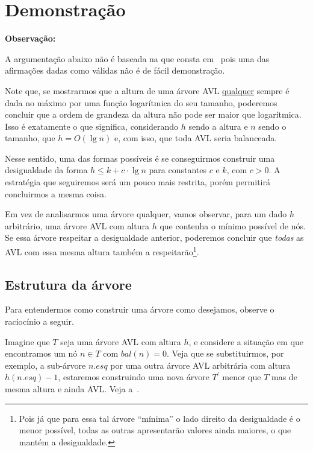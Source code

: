 \documentclass[11pt,twoside]{article}
\theoremstyle{definition}
\begin{document}
\section{Demonstração}

\begin{framed}
	{\bfseries Observação:}

	A argumentação abaixo não é baseada na que consta em~\textcite{Szwarcfiter2010} pois uma das afirmações dadas como válidas não é de fácil demonstração.
\end{framed}

Note que, se mostrarmos que a altura de uma árvore AVL \ul{qualquer} sempre é dada no máximo por uma função logarítmica do seu tamanho, poderemos concluir que a ordem de grandeza da altura não pode ser maior que logarítmica. Isso é exatamente o que significa, considerando \( h \) sendo a altura e \( n \) sendo o tamanho, que \( h = O(\lg n) \) e, com isso, que toda AVL seria balanceada.

Nesse sentido, uma das formas possíveis é se conseguirmos construir uma desigualdade da forma \( h \leq k + c \cdot \lg n \) para constantes \( c \) e \( k \), com \( c > 0 \). A estratégia que seguiremos será um pouco mais restrita, porém permitirá concluirmos a mesma coisa.

Em vez de analisarmos uma árvore qualquer, vamos observar, para um dado \( h \) arbitrário, uma árvore AVL com altura \( h \) que contenha o mínimo possível de nós. Se essa árvore respeitar a desigualdade anterior, poderemos concluir que \emph{todas} as AVL com essa mesma altura também a respeitarão\footnote{Pois já que para essa tal árvore ``mínima'' o lado direito da desigualdade é o menor possível, todas as outras apresentarão valores ainda maiores, o que mantém a desigualdade.}.

\subsection{Estrutura da árvore}

Para entendermos como construir uma árvore como desejamos, observe o raciocínio a seguir.

Imagine que \( T \) seja uma árvore AVL com altura \( h \), e considere a situação em que encontramos um nó \( n \in T \) com \( bal(n) = 0 \). Veja que se substituirmos, por exemplo, a sub-árvore \( n.esq \) por uma outra árvore AVL arbitrária com altura \( h(n.esq) - 1 \), estaremos construindo uma nova árvore \( T^\prime \) menor que \( T \) mas de mesma altura e ainda AVL. Veja a~.
\end{document}
